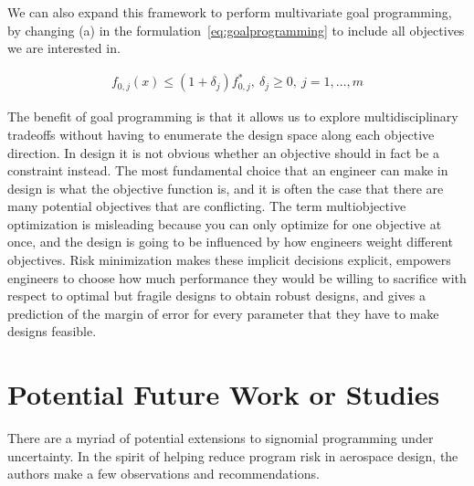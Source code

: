 
We can also expand this framework to perform multivariate goal programming,
by changing (a) in the formulation~\ref{eq:goalprogramming} to include all
objectives we are interested in.

\begin{align*}
    f_{0,j}(x) \leq (1+\delta_j) f^*_{0,j},~\delta_j \geq 0,~j = 1,\ldots, m
    \label{eq:multigoal}
\end{align*}

The benefit of goal programming is that it allows us to explore multidisciplinary tradeoffs without
having to enumerate the design space along each objective direction.
In design it is not obvious whether an objective should in fact be a constraint instead. The most
fundamental choice that an engineer can make in design is what the objective function is, and it is
often the case that there are many potential objectives that are conflicting.
The term multiobjective optimization is misleading
because you can only optimize for one objective at once,
and the design is going to be influenced by how engineers weight different objectives.
Risk minimization makes these implicit decisions explicit, empowers engineers to choose
how much performance they would be willing to sacrifice with respect
to optimal but fragile designs to obtain robust designs, and gives a prediction of the margin of error
for every parameter that they have to make designs feasible.

\section{Potential Future Work or Studies}

There are a myriad of potential extensions to signomial programming under uncertainty.
In the spirit of helping reduce program risk in aerospace design,
the authors make a few observations and recommendations.

